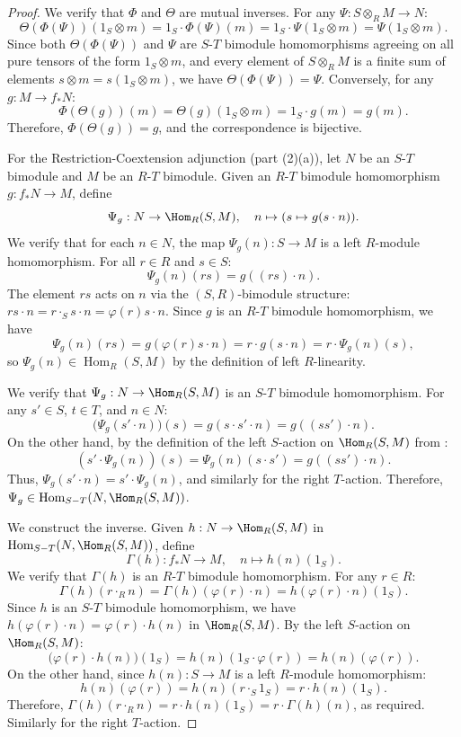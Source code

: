 \begin{proof}
    We verify that $\Phi$ and $\Theta$ are mutual inverses. For any $\Psi : S \otimes_R M \to N$:
    $$\Theta(\Phi(\Psi))(1_S \otimes m) = 1_S \cdot \Phi(\Psi)(m) = 1_S \cdot \Psi(1_S \otimes m) = \Psi(1_S \otimes m).$$
    Since both $\Theta(\Phi(\Psi))$ and $\Psi$ are $S$-$T$ bimodule homomorphisms agreeing on all pure tensors of the form $1_S \otimes m$, and every element of $S \otimes_R M$ is a finite sum of elements $s \otimes m = s(1_S \otimes m)$, we have $\Theta(\Phi(\Psi)) = \Psi$. Conversely, for any $g : M \to f_*N$:
    $$\Phi(\Theta(g))(m) = \Theta(g)(1_S \otimes m) = 1_S \cdot g(m) = g(m).$$
    Therefore, $\Phi(\Theta(g)) = g$, and the correspondence is bijective.

    For the Restriction-Coextension adjunction (part (2)(a)), let $N$ be an $S$-$T$ bimodule and $M$ be an $R$-$T$ bimodule. Given an $R$-$T$ bimodule homomorphism $g : f_*N \to M$, define
    $$\Psi_g : N \to \Hom_R(S, M), \quad n \mapsto (s \mapsto g(s \cdot n)).$$
    We verify that for each $n \in N$, the map $\Psi_g(n) : S \to M$ is a left $R$-module homomorphism. For all $r \in R$ and $s \in S$:
    $$\Psi_g(n)(rs) = g((rs) \cdot n).$$
    The element $rs$ acts on $n$ via the $(S,R)$-bimodule structure: $rs \cdot n = r \cdot_S s \cdot n = \varphi(r)s \cdot n$. Since $g$ is an $R$-$T$ bimodule homomorphism, we have
    $$\Psi_g(n)(rs) = g(\varphi(r)s \cdot n) = r \cdot g(s \cdot n) = r \cdot \Psi_g(n)(s),$$
    so $\Psi_g(n) \in \operatorname{Hom}_R(S, M)$ by the definition of left $R$-linearity.

    We verify that $\Psi_g : N \to \Hom_R(S, M)$ is an $S$-$T$ bimodule homomorphism. For any $s' \in S$, $t \in T$, and $n \in N$:
    $$\bigl(\Psi_g(s' \cdot n)\bigr)(s) = g(s \cdot s' \cdot n) = g((ss') \cdot n).$$
    On the other hand, by the definition of the left $S$-action on $\Hom_R(S,M)$ from :
    $$(s' \cdot \Psi_g(n))(s) = \Psi_g(n)(s \cdot s') = g((ss') \cdot n).$$
    Thus, $\Psi_g(s' \cdot n) = s' \cdot \Psi_g(n)$, and similarly for the right $T$-action. Therefore, $\Psi_g \in \operatorname{Hom}_{S-T}(N, \Hom_R(S, M))$.

    We construct the inverse. Given $h : N \to \Hom_R(S, M)$ in $\operatorname{Hom}_{S-T}(N, \Hom_R(S, M))$, define
    $$\Gamma(h) : f_*N \to M, \quad n \mapsto h(n)(1_S).$$
    We verify that $\Gamma(h)$ is an $R$-$T$ bimodule homomorphism. For any $r \in R$:
    $$\Gamma(h)(r \cdot_R n) = \Gamma(h)(\varphi(r) \cdot n) = h(\varphi(r) \cdot n)(1_S).$$
    Since $h$ is an $S$-$T$ bimodule homomorphism, we have $h(\varphi(r) \cdot n) = \varphi(r) \cdot h(n)$ in $\Hom_R(S, M)$. By the left $S$-action on $\Hom_R(S, M)$:
    $$\bigl(\varphi(r) \cdot h(n)\bigr)(1_S) = h(n)(1_S \cdot \varphi(r)) = h(n)(\varphi(r)).$$
    On the other hand, since $h(n) : S \to M$ is a left $R$-module homomorphism:
    $$h(n)(\varphi(r)) = h(n)(r \cdot_S 1_S) = r \cdot h(n)(1_S).$$
    Therefore, $\Gamma(h)(r \cdot_R n) = r \cdot h(n)(1_S) = r \cdot \Gamma(h)(n)$, as required. Similarly for the right $T$-action.


\end{proof}
